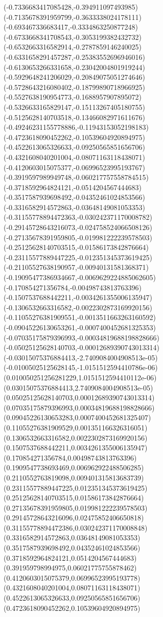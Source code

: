 {(-0.7336683417085428,-0.394911097493985)
(-0.7135678391959799,-0.3633338024178111)
(-0.693467336683417,-0.3334863250877248)
(-0.6733668341708543,-0.3053199382432732)
(-0.6532663316582914,-0.2787859146240025)
(-0.6331658291457287,-0.25383552696946016)
(-0.6130653266331658,-0.23042004801919244)
(-0.5929648241206029,-0.20849075051274646)
(-0.5728643216080402,-0.18799890718966925)
(-0.5527638190954773,-0.1688957907895072)
(-0.5326633165829147,-0.15113267405180755)
(-0.5125628140703518,-0.13466082971611676)
(-0.49246231155778886,-0.11943153052198183)
(-0.4723618090452262,-0.10539604920894975)
(-0.4522613065326633,-0.09250565851656706)
(-0.4321608040201004,-0.08071163118438071)
(-0.4120603015075377,-0.06996523995193767)
(-0.3919597989949748,-0.060217757558784515)
(-0.3718592964824121,-0.0514204567444683)
(-0.3517587939698492,-0.04352461024853566)
(-0.3316582914572863,-0.03648149081053353)
(-0.31155778894472363,-0.030242371170008782)
(-0.29145728643216073,-0.024758524066508126)
(-0.27135678391959805,-0.019981222239578503)
(-0.25125628140703515,-0.01586173842876664)
(-0.23115577889447225,-0.012351345373619425)
(-0.21105527638190957,-0.00940131581368371)
(-0.19095477386934667,-0.0069629224885062605)
(-0.170854271356784,-0.00498743813763396)
(-0.1507537688442211,-0.0034261355006135947)
(-0.1306532663316582,-0.0022302873169920156)
(-0.11055276381909551,-0.0013511663263160592)
(-0.09045226130653261,-0.0007400452681325353)
(-0.07035175879396993,-0.00034819688198828666)
(-0.05025125628140703,-0.00012689390743013314)
(-0.03015075376884413,-2.7409084004908513e-05)
(-0.01005025125628145,-1.0151512594410786e-06)
(0.010050251256281229,1.0151512594410112e-06)
(0.03015075376884413,2.7409084004908513e-05)
(0.05025125628140703,0.00012689390743013314)
(0.07035175879396993,0.00034819688198828666)
(0.09045226130653283,0.0007400452681325407)
(0.11055276381909529,0.001351166326316051)
(0.1306532663316582,0.0022302873169920156)
(0.1507537688442211,0.0034261355006135947)
(0.170854271356784,0.00498743813763396)
(0.1909547738693469,0.006962922488506285)
(0.2110552763819098,0.009401315813683739)
(0.23115577889447225,0.012351345373619425)
(0.25125628140703515,0.01586173842876664)
(0.27135678391959805,0.019981222239578503)
(0.29145728643216096,0.02475852406650818)
(0.31155778894472386,0.030242371170008848)
(0.3316582914572863,0.03648149081053353)
(0.3517587939698492,0.04352461024853566)
(0.3718592964824121,0.0514204567444683)
(0.391959798994975,0.06021775755878462)
(0.4120603015075379,0.06996523995193778)
(0.4321608040201004,0.08071163118438071)
(0.4522613065326633,0.09250565851656706)
(0.4723618090452262,0.10539604920894975)
}
